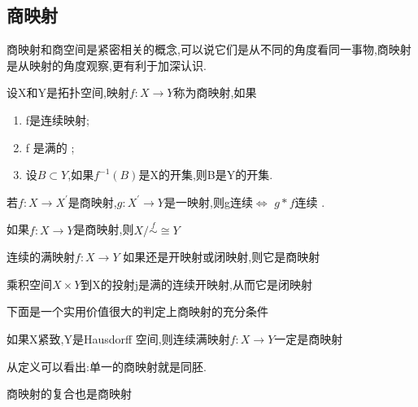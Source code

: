  \subsection*{商映射}
 商映射和商空间是紧密相关的概念,可以说它们是从不同的角度看同一事物,商映射是从映射的角度观察,更有利于加深认识.
\begin{definition}
    设X和Y是拓扑空间,映射\(f : X \rightarrow Y \)称为商映射,如果
    \begin{enumerate}
        \item f是连续映射; \\
        \item f 是满的 ;\\
        \item 设\(B \subset Y \),如果\(f^{-1}(B)\)是X的开集,则B是Y的开集.
    \end{enumerate}
\end{definition}
\begin{theorem}
    若\(f: X \rightarrow X^{'}\)是商映射,\(g: X^{'} \rightarrow Y\)是一映射,则g连续\(\Leftrightarrow\) \(g*f\)连续 .
\end{theorem}
\begin{corollary}
    如果\(f: X \rightarrow Y\)是商映射,则\(X / \overset{f}{\sim} \cong Y \)  
\end{corollary}
\begin{corollary}
    连续的满映射\(f : X \rightarrow Y  \) 如果还是开映射或闭映射,则它是商映射
\end{corollary}
\begin{example}
    乘积空间\(X \times Y \)到X的投射j是满的连续开映射,从而它是闭映射
\end{example}
下面是一个实用价值很大的判定上商映射的充分条件
\begin{theorem}
    如果X紧致,Y是Hausdorff 空间,则连续满映射\(f: X \rightarrow Y \)一定是商映射
\end{theorem}
从定义可以看出:单一的商映射就是同胚.
\begin{corollary}
    商映射的复合也是商映射
\end{corollary}
